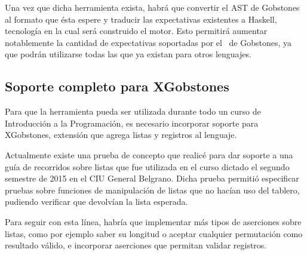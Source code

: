 Una vez que dicha herramienta exista, habrá que convertir el AST de Gobstones al formato que ésta espere y traducir las expectativas existentes a Haskell, tecnología en la cual será construido el motor. Esto permitirá aumentar notablemente la cantidad de expectativas soportadas por el \runner\ de Gobstones, ya que podrán utilizarse todas las que ya existan para otros lenguajes.

\subsection{Soporte completo para XGobstones}
Para que la herramienta pueda ser utilizada durante todo un curso de Introducción a la Programación, es necesario incorporar soporte para XGobstones, extensión que agrega listas y registros al lenguaje.

Actualmente existe una prueba de concepto que realicé para dar soporte a una guía de recorridos sobre listas que fue utilizada en el curso dictado el segundo semestre de 2015 en el CIU General Belgrano. Dicha prueba permitió especificar pruebas sobre funciones de manipulación de listas que no hacían uso del tablero, pudiendo verificar que devolvían la lista esperada.

Para seguir con esta línea, habría que implementar más tipos de aserciones sobre listas, como por ejemplo saber su longitud o aceptar cualquier permutación como resultado válido, e incorporar aserciones que permitan validar registros.

